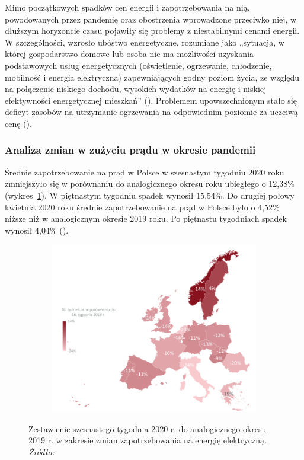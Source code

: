 \documentclass[polish, twoside, 12pt, a4paper]{article}
\theoremstyle{definition}
\theoremstyle{plain}
\theoremstyle{remark}
\begin{document}
Mimo początkowych spadków cen energii i zapotrzebowania na nią, powodowanych przez pandemię oraz obostrzenia wprowadzone przeciwko niej, w dłuższym horyzoncie czasu pojawiły się problemy z niestabilnymi cenami energii. W szczególności, wzrosło ubóstwo  energetyczne,  rozumiane jako „sytuacja, w której gospodarstwo domowe lub osoba nie ma możliwości uzyskania podstawowych usług energetycznych (oświetlenie, ogrzewanie, chłodzenie, mobilność i energia elektryczna) zapewniających godny poziom życia, ze względu na połączenie niskiego dochodu, wysokich wydatków na energię i niskiej efektywności energetycznej  mieszkań” (\cite{gorska2023}). Problemem upowszechnionym stało się deficyt zasobów na utrzymanie ogrzewania na odpowiednim poziomie za uczciwą cenę (\cite{gorska2023}). 


\subsubsection{Analiza zmian w zużyciu prądu w okresie pandemii}

Średnie zapotrzebowanie na prąd w Polsce w szesnastym tygodniu 2020 roku zmniejszyło się w porównaniu do analogicznego okresu roku ubiegłego o 12,38\% (wykres~\ref{fig:x5}). W piętnastym tygodniu spadek wynosił 15,54\%. Do drugiej połowy kwietnia 2020 roku średnie zapotrzebowanie na prąd w Polsce było o 4,52\% niższe niż w analogicznym okresie 2019 roku. Po piętnastu tygodniach spadek wynosił 4,04\% (\cite{biuroanalizpfr2020}).

\begin{figure}[hbt]
  \centering

  \begin{subfigure}[t]{0.45\textwidth}
    \includegraphics[width=\textwidth]{./figure_5}
  \end{subfigure}

  \captionsetup{margin=10pt,font=small,labelfont=bf,width=.8\textwidth}

  \caption[Zmiany zapotrzebowania na energię elektryczną (1 tydzień)]{ Zestawienie szesnastego tygodnia 2020 r. do analogicznego okresu 2019 r. w zakresie zmian zapotrzebowania na energię elektryczną. \textit{Źródło:} \cite{biuroanalizpfr2020}}\label{fig:x5}
\end{figure}
\end{document}
